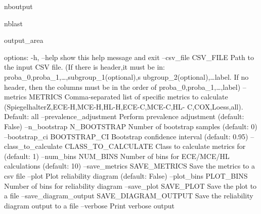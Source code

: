 \documentclass[letterpaper,10pt,english]{sphinxmanual}
\begin{document}
\begin{sphinxuseclass}{nboutput}
\begin{sphinxuseclass}{nblast}
{\begin{sphinxuseclass}{output_area}
\begin{sphinxuseclass}{}
\begin{sphinxVerbatim}[commandchars=\\\{\}]
options:
  -h, --help            show this help message and exit
  --csv\_file CSV\_FILE   Path to the input CSV file. (If there is header,it
                        must be in: proba\_0,proba\_1,{\ldots},subgroup\_1(optional),s
                        ubgroup\_2(optional),{\ldots}label. If no header, then the
                        columns must be in the order of
                        proba\_0,proba\_1,{\ldots},label)
  --metrics METRICS     Comma-separated list of specific metrics to calculate
                        (SpiegelhalterZ,ECE-H,MCE-H,HL-H,ECE-C,MCE-C,HL-
                        C,COX,Loess,all). Default: all
  --prevalence\_adjustment
                        Perform prevalence adjustment (default: False)
  --n\_bootstrap N\_BOOTSTRAP
                        Number of bootstrap samples (default: 0)
  --bootstrap\_ci BOOTSTRAP\_CI
                        Bootstrap confidence interval (default: 0.95)
  --class\_to\_calculate CLASS\_TO\_CALCULATE
                        Class to calculate metrics for (default: 1)
  --num\_bins NUM\_BINS   Number of bins for ECE/MCE/HL calculations (default:
                        10)
  --save\_metrics SAVE\_METRICS
                        Save the metrics to a csv file
  --plot                Plot reliability diagram (default: False)
  --plot\_bins PLOT\_BINS
                        Number of bins for reliability diagram
  --save\_plot SAVE\_PLOT
                        Save the plot to a file
  --save\_diagram\_output SAVE\_DIAGRAM\_OUTPUT
                        Save the reliability diagram output to a file
  --verbose             Print verbose output
\end{sphinxVerbatim}



\end{sphinxuseclass}
\end{sphinxuseclass}
}

\end{sphinxuseclass}
\end{sphinxuseclass}
\end{document}
